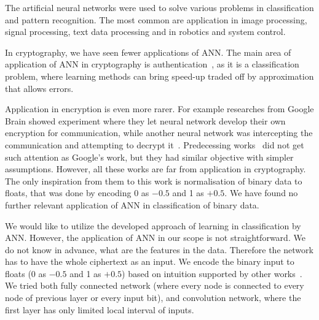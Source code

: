 \documentclass[
  print, %
  Table,   %
  nolof,     %
  nolot,     %
  11pt, %
  oneside  %
]{fithesis3}
\newcommand{\todo}[1]{TODO: \textit{#1}}
\begin{document}
The artificial neural networks were used to solve various problems in classification and pattern recognition. The most common are application in image processing, signal processing, text data processing and in robotics and system control.

In cryptography, we have seen fewer applications of ANN. The main area of application of ANN in cryptography is authentication~\cite{li2001remote}, as it is a classification problem, where learning methods can bring speed-up traded off by approximation that allows errors.

Application in encryption is even more rarer. For example researches from Google Brain showed experiment where they let neural network develop their own encryption for communication, while another neural network was intercepting the communication and attempting to decrypt it~\cite{abadi2016learning}. Predecessing works~\cite{shihab2006backpropagation, volna2012cryptography} did not get such attention as Google's work, but they had similar objective with simpler assumptions. However, all these works are far from application in cryptography. The only inspiration from them to this work is normalisation of binary data to floats, that was done by encoding 0 as $-0.5$ and 1 as $+0.5$. We have found no further relevant application of ANN in classification of binary data.

We would like to utilize the developed approach of learning in classification by ANN. However, the application of ANN in our scope is not straightforward. We do not know in advance, what are the features in the data. Therefore the network has to have the whole ciphertext as an input. We encode the binary input to floats (0 as $-0.5$ and 1 as $+0.5$) based on intuition supported by other works~\cite{abadi2016learning,shihab2006backpropagation}. We tried both fully connected network (where every node is connected to every node of previous layer or every input bit), and convolution network, where the first layer has only limited local interval of inputs. 


\end{document}
